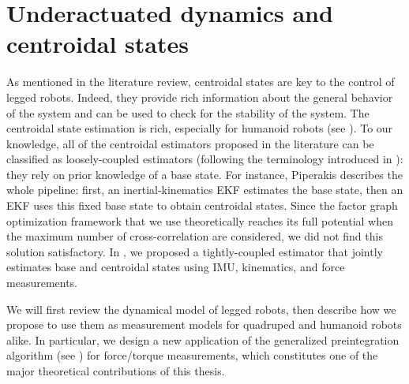 \chapter{Underactuated dynamics and centroidal states}
\minitoc
\bigskip


As mentioned in the literature review, centroidal states are key to the control of legged robots. Indeed, they provide rich information about the general
behavior of the system and can be used to check for the stability of the system. The centroidal state estimation is rich, especially for humanoid
robots (see ). To our knowledge, all of the centroidal estimators proposed in the literature can be classified as loosely-coupled estimators 
(following the terminology introduced in ): they rely on prior knowledge of a base state. For instance, Piperakis \cite{piperakis2018nonlinear} describes the
whole pipeline: first, an inertial-kinematics EKF estimates the base state, then an EKF uses this fixed base state to obtain centroidal states. 
Since the factor graph optimization framework that we use theoretically reaches its full potential when the maximum number of cross-correlation
are considered, we did not find this solution satisfactory. In \cite{fourmy2021contact}, we proposed a tightly-coupled estimator that jointly estimates
base and centroidal states using IMU, kinematics, and force measurements.

We will first review the dynamical model of legged robots, then describe how we propose to use them as measurement models for quadruped and humanoid robots alike.
In particular, we design a new application of the generalized preintegration algorithm (see ) for force/torque measurements, which constitutes
one of the major theoretical contributions of this thesis.


